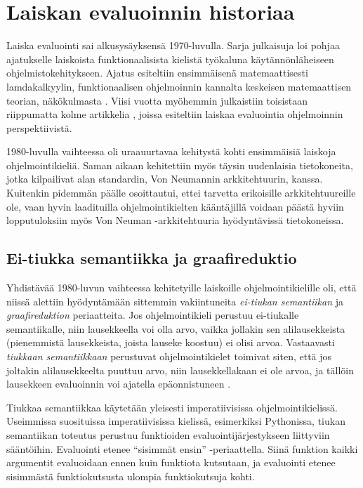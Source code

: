 \section{Laiskan evaluoinnin historiaa}

Laiska evaluointi sai alkusysäyksensä 1970-luvulla. Sarja julkaisuja loi pohjaa ajatukselle laiskoista funktionaalisista kielistä työkaluna käytännönläheiseen ohjelmistokehitykseen. Ajatus esiteltiin ensimmäisenä matemaattisesti lamdakalkyylin, funktionaalisen ohjelmoinnin kannalta keskeisen matemaattisen teorian, näkökulmasta \citep{wadsworth1971semantics}. Viisi vuotta myöhemmin julkaistiin toisistaan riippumatta kolme artikkelia \citep{henderson1976lazy,friedman1976cuns,saslmanualturner}, joissa esiteltiin laiskaa evaluointia ohjelmoinnin perspektiivistä.

1980-luvulla vaihteessa oli uraauurtavaa kehitystä kohti ensimmäisiä laiskoja ohjelmointikieliä. Saman aikaan kehitettiin myös täysin uudenlaisia tietokoneita, jotka kilpailivat alan standardin, Von Neumannin arkkitehtuurin, kanssa. Kuitenkin pidemmän päälle osoittautui, ettei tarvetta erikoisille arkkitehtuureille ole, vaan hyvin laadituilla ohjelmointikielten kääntäjillä voidaan päästä hyviin lopputuloksiin myös Von Neuman -arkkitehtuuria hyödyntävissä tietokoneissa. \citep{hudak2007history}

\subsection{Ei-tiukka semantiikka ja graafireduktio}

Yhdistävää 1980-luvun vaihteessa kehitetyille laiskoille ohjelmointikielille oli, että niissä alettiin hyödyntämään sittemmin vakiintuneita \textit{ei-tiukan semantiikan} ja \textit{graafireduktion} periaatteita. Jos ohjelmointikieli perustuu ei-tiukalle semantiikalle, niin lausekkeella voi olla arvo, vaikka jollakin sen alilausekkeista (pienemmistä lausekkeista, joista lauseke koostuu) ei olisi arvoa. Vastaavasti \textit{tiukkaan semantiikkaan} perustuvat ohjelmointikielet toimivat siten, että jos joltakin alilausekkeelta puuttuu arvo, niin lausekkellakaan ei ole arvoa, ja tällöin lausekkeen evaluoinnin voi ajatella epäonnistuneen \citep[s. 523]{scott2009programming}.

Tiukkaa semantiikkaa käytetään yleisesti imperatiivisissa ohjelmointikielissä. Useimmissa suosituissa imperatiivisissa kielissä, esimerkiksi Pythonissa, tiukan semantiikan toteutus perustuu funktioiden evaluointijärjestykseen liittyviin sääntöihin. Evaluointi etenee ``sisimmät ensin'' -periaattella. Siinä funktion kaikki argumentit evaluoidaan ennen kuin funktiota kutsutaan, ja evaluointi etenee sisimmästä funktiokutsusta ulompia funktiokutsuja kohti.

